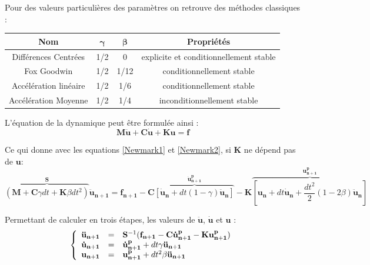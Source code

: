 \documentclass[12pt,a4paper]{report}
\begin{document}
\noindent
Pour des valeurs particulières des paramètres on retrouve des méthodes classiques :
\begin{center}
\begin{tabular}{c c c c}
\textbf{Nom} & $\boldsymbol{\gamma}$ & $\boldsymbol{\beta}$ & \textbf{Propriétés}\\
\hline
Différences Centrées&1/2&0&explicite et conditionnellement stable\\
Fox Goodwin&1/2&1/12&conditionnellement stable\\
Accélération linéaire&1/2&1/6&conditionnellement stable\\
Accélération Moyenne&1/2&1/4&inconditionnellement stable\\
\end{tabular}
\end{center}

\noindent
L'équation de la dynamique peut être formulée ainsi :
\begin{equation}
	\mathbf{M} \mathbf{\ddot{u}} + \mathbf{C} \mathbf{\dot{u}} + \mathbf{K} \mathbf{u} = \mathbf{f}
\end{equation}

\noindent
Ce qui donne avec les equations \ref{Newmark1} et \ref{Newmark2}, si $\mathbf{K}$ ne dépend pas de $\mathbf{u}$:
\begingroup\small
\begin{equation}
	\overbrace{(\mathbf{M}+\mathbf{C} \gamma dt + \mathbf{K}\beta dt^2)}^{\mathbf{S}} \mathbf{\ddot{u}_{n+1}} 
	= \mathbf{f_{n+1}} 
	- \mathbf{C}\overbrace	{
						[\mathbf{\dot{u}_n} + dt (1-\gamma) \mathbf{\ddot{u}_n}]
					}
					^{\mathbf{\dot{u}^p_{n+1}}}
	-\mathbf{K}\overbrace	{
						[\mathbf{u_n} + dt \mathbf{\dot{u}_n} 
						 + \frac{dt^2}{2} (1-2\beta) \mathbf{\ddot{u}_n}]
					}
					^{\mathbf{u^p_{n+1}}}
\end{equation}
\endgroup

\noindent
Permettant de calculer en trois étapes, les valeurs de $\mathbf{\ddot{u}}$, $\mathbf{\dot{u}}$ et $\mathbf{u}$ :
\begin{equation}
	\left\{
		\begin{array}{r c l}
			\mathbf{\ddot{u}_{n+1}} 
			&=& \mathbf{S}^{-1} (  \mathbf{f_{n+1}} - \mathbf{C} \mathbf{\dot{u}^p_{n+1}} - \mathbf{K} \mathbf{u^p_{n+1}}  )
			\\
			\mathbf{\dot{u}_{n+1}} &=& \mathbf{\dot{u}^p_{n+1}} + dt \gamma \mathbf{\ddot{u}_{n+1}}
			\\
			\mathbf{u_{n+1}} &=& \mathbf{u^p_{n+1}} + dt^2 \beta \mathbf{\ddot{u}_{n+1}}
		\end{array}
	\right.
\end{equation}
\end{document}
